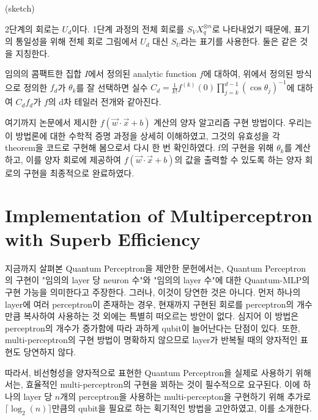 \begin{pf}(sketch)

    2단계의 회로는 \(U_d\)이다. 1단계 과정의 전체 회로를 \(S_VX_q^{\otimes n}\)로 나타내었기 때문에, 표기의 통일성을 위해 전체 회로 그림에서 \(U_d\) 대신 \(S_U\)라는 표기를 사용한다. 둘은 같은 것을 지칭한다.


\end{pf}

\begin{corollary}
    임의의 콤팩트한 집합 \(I\)에서 정의된 analytic function \(f\)에 대하여, 위에서 정의된 방식으로 정의한 \(f_d\)가 \(\theta_k\)를 잘 선택하면 실수 \(C_d = \frac{1}{k!}f^{(k)}(0)\prod_{j=k}^{d-1}(\cos\theta_j)^{-1}\)에 대하여 \(C_df_d\)가 \(f\)의 d차 테일러 전개와 같아진다.
\end{corollary}

여기까지 논문에서 제시한 \(f(\vec{w}\cdot\vec{x}+b)\) 계산의 양자 알고리즘 구현 방법이다.
우리는 이 방법론에 대한 수학적 증명 과정을 상세히 이해하였고, 그것의 유효성을 각 theorem을 코드로 구현해 봄으로서 다시 한 번 확인하였다.
f의 구현을 위해 \(\theta_k\)를 계산하고, 이를 양자 회로에 제공하여 \(f(\vec{w}\cdot\vec{x}+b)\)의 값을 출력할 수 있도록 하는 양자 회로의 구현을 최종적으로 완료하였다.

\section{Implementation of Multiperceptron with Superb Efficiency}

지금까지 살펴본 Quantum Perceptron을 제안한 문헌에서는, Quantum Perceptron의 구현이 "임의의 layer 당 neuron 수"와 "임의의 layer 수"에 대한 Quantum-MLP의 구현 가능을 의미한다고 주장한다. 그러나, 이것이 당연한 것은 아니다. 먼저 하나의 layer에 여러 perceptron이 존재하는 경우, 현재까지 구현된 회로를 perceptron의 개수만큼 복사하여 사용하는 것 외에는 특별히 떠오르는 방안이 없다. 심지어 이 방법은 perceptron의 개수가 증가함에 따라 과하게 qubit이 늘어난다는 단점이 있다. 또한, multi-perceptron의 구현 방법이 명확하지 않으므로 layer가 반복될 때의 양자적인 표현도 당연하지 않다.

따라서, 비선형성을 양자적으로 표현한 Quantum Perceptron을 실제로 사용하기 위해서는, 효율적인 multi-perceptron의 구현을 꾀하는 것이 필수적으로 요구된다. 이에 하나의 layer 당 $n$개의 perceptron을 사용하는 multi-percepton을 구현하기 위해 추가로 $\lceil {\log_2(n)} \rceil$만큼의 qubit을 필요로 하는 획기적인 방법을 고안하였고, 이를 소개한다.


